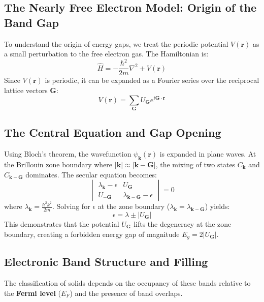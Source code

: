 \documentclass[10pt, a4paper]{article}
\begin{document}
\subsection{The Nearly Free Electron Model: Origin of the Band Gap}

To understand the origin of energy gaps, we treat the periodic potential $V(\mathbf{r})$ as a small perturbation to the free electron gas. The Hamiltonian is:
\begin{equation}
    \hat{H} = -\frac{\hbar^2}{2m}\nabla^2 + V(\mathbf{r})
\end{equation}
Since $V(\mathbf{r})$ is periodic, it can be expanded as a Fourier series over the reciprocal lattice vectors $\mathbf{G}$:
\begin{equation}
    V(\mathbf{r}) = \sum_{\mathbf{G}} U_{\mathbf{G}} e^{i\mathbf{G}\cdot\mathbf{r}}
\end{equation}

\subsection{The Central Equation and Gap Opening}
Using Bloch's theorem, the wavefunction $\psi_{\mathbf{k}}(\mathbf{r})$ is expanded in plane waves. At the Brillouin zone boundary where $|\mathbf{k}| \approx |\mathbf{k}-\mathbf{G}|$, the mixing of two states $C_{\mathbf{k}}$ and $C_{\mathbf{k}-\mathbf{G}}$ dominates. The secular equation becomes:
\begin{equation}
    \begin{vmatrix} 
    \lambda_{\mathbf{k}} - \epsilon & U_{\mathbf{G}} \\
    U_{-\mathbf{G}} & \lambda_{\mathbf{k}-\mathbf{G}} - \epsilon 
    \end{vmatrix} = 0
\end{equation}
where $\lambda_{\mathbf{k}} = \frac{\hbar^2 k^2}{2m}$. Solving for $\epsilon$ at the zone boundary ($\lambda_{\mathbf{k}} = \lambda_{\mathbf{k}-\mathbf{G}}$) yields:
\begin{equation}
    \epsilon = \lambda \pm |U_{\mathbf{G}}|
\end{equation}
This demonstrates that the potential $U_{\mathbf{G}}$ lifts the degeneracy at the zone boundary, creating a forbidden energy gap of magnitude $E_g = 2|U_{\mathbf{G}}|$.

\subsection{Electronic Band Structure and Filling}
The classification of solids depends on the occupancy of these bands relative to the \textbf{Fermi level} ($E_F$) and the presence of band overlaps.
\end{document}

